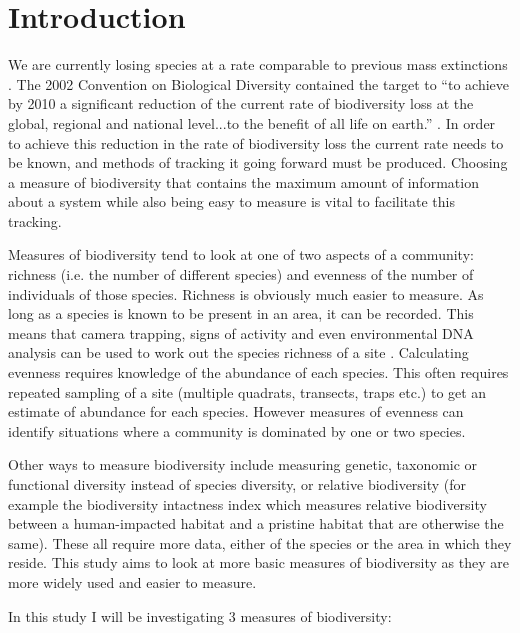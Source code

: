 \documentclass[11pt]{article}
\begin{document}
\newpage
\section{Introduction}

We are currently losing species at a rate comparable to previous mass extinctions \parencite{Ceballos2015}. The 2002 Convention on Biological Diversity contained the target to “to achieve by 2010 a significant reduction of the current rate of biodiversity loss at the global, regional and national level...to the benefit of all life on earth.” \parencite{Balmford2005}. In order to achieve this reduction in the rate of biodiversity loss the current rate needs to be known, and methods of tracking it going forward must be produced. Choosing a measure of biodiversity that contains the maximum amount of information about a system while also being easy to measure is vital to facilitate this tracking.

Measures of biodiversity tend to look at one of two aspects of a community: richness (i.e. the number of different species) and evenness of the number of individuals of those species. Richness is obviously much easier to measure. As long as a species is known to be present in an area, it can be recorded. This means that camera trapping, signs of activity and even environmental DNA analysis can be used to work out the species richness of a site \parencite{Li2016,Rovero2014}. Calculating evenness requires knowledge of the abundance of each species. This often requires repeated sampling of a site (multiple quadrats, transects, traps etc.) to get an estimate of abundance for each species. However measures of evenness can identify situations where a community is dominated by one or two species. 

Other ways to measure biodiversity include measuring genetic, taxonomic or functional diversity instead of species diversity, or relative biodiversity (for example the biodiversity intactness index \parencite{Scholes2005} which measures relative biodiversity between a human-impacted habitat and a pristine habitat that are otherwise the same). These all require more data, either of the species or the area in which they reside. This study aims to look at more basic measures of biodiversity as they are more widely used and easier to measure.

In this study I will be investigating 3 measures of biodiversity:
\end{document}
